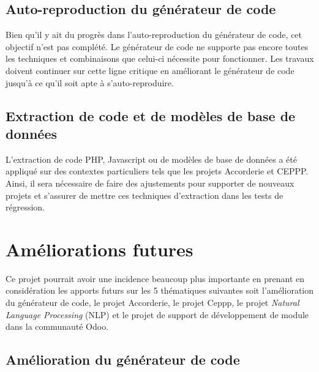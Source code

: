 \subsection{Auto-reproduction du générateur de code}
Bien qu'il y ait du progrès dans l'auto-reproduction du générateur de code, cet objectif n'est pas complété. Le générateur de code ne supporte pas encore toutes les techniques et combinaisons que celui-ci nécessite pour fonctionner. Les travaux doivent continuer sur cette ligne critique en améliorant le générateur de code jusqu'à ce qu'il soit apte à s'auto-reproduire.

\subsection{Extraction de code et de modèles de base de données}
L'extraction de code PHP, Javascript ou de modèles de base de données a été appliqué sur des contextes particuliers tels que les projets Accorderie et CEPPP. Ainsi, il sera nécessaire de faire des ajustements pour supporter de nouveaux projets et s'assurer de mettre ces techniques d'extraction dans les tests de régression.

\section{Améliorations futures}


Ce projet pourrait avoir une incidence beaucoup plus importante en prenant en considération les apports futurs sur les 5 thématiques suivantes soit l'amélioration du générateur de code, le projet Accorderie, le projet Ceppp, le projet \textit{Natural Language Processing} (NLP) et le projet de support de développement de module dans la communauté Odoo.

\subsection{Amélioration du générateur de code}

